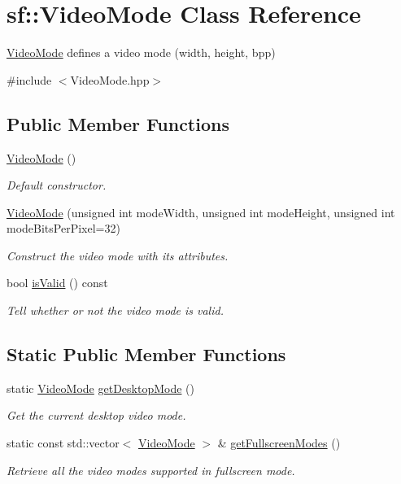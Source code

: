 \hypertarget{classsf_1_1_video_mode}{}\section{sf\+:\+:Video\+Mode Class Reference}
\label{classsf_1_1_video_mode}


\hyperlink{classsf_1_1_video_mode}{Video\+Mode} defines a video mode (width, height, bpp)  




{\ttfamily \#include $<$Video\+Mode.\+hpp$>$}

\subsection*{Public Member Functions}
\begin{DoxyCompactItemize}
\item 
\hyperlink{classsf_1_1_video_mode_a04c9417e5c304510bef5f6aeb03f6ce1}{Video\+Mode} ()
\begin{DoxyCompactList}\small\item\em Default constructor. \end{DoxyCompactList}\item 
\hyperlink{classsf_1_1_video_mode_a46c35ed41de9e115661dcd529d64e9d3}{Video\+Mode} (unsigned int mode\+Width, unsigned int mode\+Height, unsigned int mode\+Bits\+Per\+Pixel=32)
\begin{DoxyCompactList}\small\item\em Construct the video mode with its attributes. \end{DoxyCompactList}\item 
bool \hyperlink{classsf_1_1_video_mode_ad5e04c044b0925523c75ecb173d2129a}{is\+Valid} () const
\begin{DoxyCompactList}\small\item\em Tell whether or not the video mode is valid. \end{DoxyCompactList}\end{DoxyCompactItemize}
\subsection*{Static Public Member Functions}
\begin{DoxyCompactItemize}
\item 
static \hyperlink{classsf_1_1_video_mode}{Video\+Mode} \hyperlink{classsf_1_1_video_mode_ac1be160a4342e6eafb2cb0e8c9b18d44}{get\+Desktop\+Mode} ()
\begin{DoxyCompactList}\small\item\em Get the current desktop video mode. \end{DoxyCompactList}\item 
static const std\+::vector$<$ \hyperlink{classsf_1_1_video_mode}{Video\+Mode} $>$ \& \hyperlink{classsf_1_1_video_mode_a6815b9b3b35767d5b4563fbed4bfc67b}{get\+Fullscreen\+Modes} ()
\begin{DoxyCompactList}\small\item\em Retrieve all the video modes supported in fullscreen mode. \end{DoxyCompactList}\end{DoxyCompactItemize}
